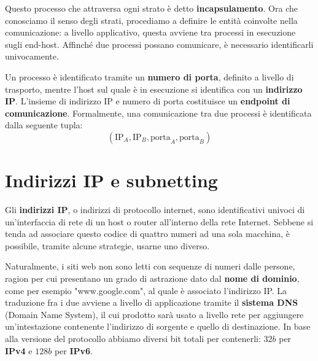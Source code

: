 \noindent Questo processo che attraversa ogni strato è detto \textbf{incapsulamento}. Ora che conosciamo il senso degli strati, procediamo a definire le entità coinvolte nella comunicazione: a livello applicativo, questa avviene tra processi in esecuzione sugli end-host. Affinché due processi possano comunicare, è necessario identificarli univocamente.\par
Un processo è identificato tramite un \textbf{numero di porta}, definito a livello di trasporto, mentre l'host sul quale è in esecuzione si identifica con un \textbf{indirizzo IP}. L'insieme di indirizzo IP e numero di porta costituisce un \textbf{endpoint di comunicazione}. Formalmente, una comunicazione tra due processi è identificata dalla seguente tupla: \[(\text{IP}_A, \text{IP}_B, \text{porta}_A, \text{porta}_B)\]

%

\section{Indirizzi IP e subnetting}
\noindent Gli \textbf{indirizzi IP}, o indirizzi di protocollo internet, sono identificativi univoci di un'interfaccia di rete di un host o router all'interno della rete Internet. Sebbene si tenda ad associare questo codice di quattro numeri ad una sola macchina, è possibile, tramite alcune strategie, usarne uno diverso.\par
Naturalmente, i siti web non sono letti con sequenze di numeri dalle persone, ragion per cui presentano un grado di astrazione dato dal \textbf{nome di dominio}, come per esempio "www.google.com", al quale è associato l'indirizzo IP. La traduzione fra i due avviene a livello di applicazione tramite il \textbf{sistema DNS} (Domain Name System), il cui prodotto sarà usato a livello rete per aggiungere un'intestazione contenente l'indirizzo di sorgente e quello di destinazione. In base alla versione del protocollo abbiamo diversi bit totali per contenerli: $32b$ per \textbf{IPv4} e $128b$ per \textbf{IPv6}.\newline

